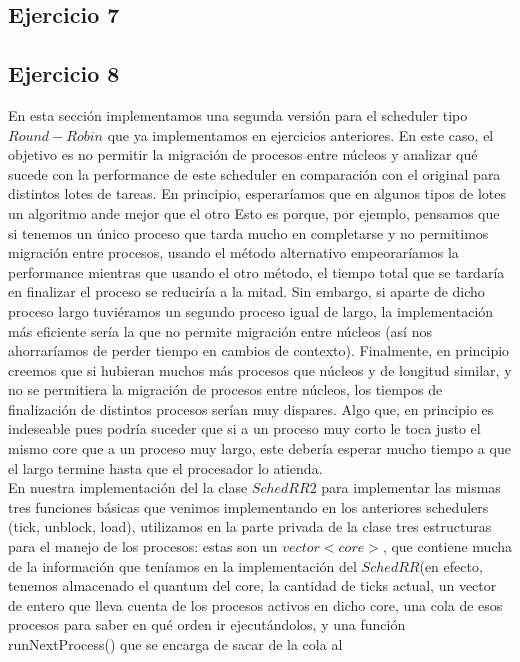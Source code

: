\documentclass[a4paper]{article}
\begin{document}
\newpage
\subsection{Ejercicio 7}
\newpage
\subsection{Ejercicio 8}
En esta secci\'on implementamos una segunda versi\'on para el scheduler tipo $Round-Robin$ que ya implementamos
en ejercicios anteriores. En este caso, el objetivo es no permitir la migraci\'on de procesos entre n\'ucleos y
analizar qu\'e sucede con la performance de este scheduler en comparaci\'on con el original para distintos lotes
de tareas. En principio, esperar\'iamos que en algunos tipos de lotes un algoritmo ande mejor que el otro
Esto es porque, por ejemplo, pensamos que si tenemos un 
\'unico proceso que tarda mucho en completarse y no permitimos migraci\'on entre procesos, usando el m\'etodo 
alternativo empeorar\'iamos la performance mientras que usando el otro m\'etodo, el tiempo total que se tardar\'ia
en finalizar el proceso se reducir\'ia a la mitad. Sin embargo, si aparte de dicho proceso largo tuvi\'eramos un
segundo proceso igual de largo, la implementaci\'on m\'as eficiente ser\'ia la que no permite migraci\'on entre 
n\'ucleos (as\'i nos ahorrar\'iamos de perder tiempo en cambios de contexto). Finalmente, en principio creemos que
si hubieran muchos m\'as procesos que n\'ucleos y de longitud similar, 
y no se permitiera la migraci\'on de procesos entre n\'ucleos, los tiempos de finalizaci\'on de distintos 
procesos ser\'ian muy dispares. Algo que, en principio es indeseable pues podr\'ia suceder que si a un proceso muy 
corto le toca justo el mismo core que a un proceso muy largo, este deber\'ia esperar mucho tiempo a que el largo
termine hasta que el procesador lo atienda. \\
En nuestra implementaci\'on del la clase $SchedRR2$ para implementar las mismas tres funciones b\'asicas que venimos
implementando en los anteriores schedulers (tick, unblock, load), utilizamos en la parte privada de la clase tres
estructuras para el manejo de los procesos: estas son un $vector<core>$, que contiene mucha de la informaci\'on 
que ten\'iamos en la implementaci\'on del $SchedRR$(en efecto, tenemos almacenado el quantum del core, la cantidad de
ticks actual, un vector de entero que lleva cuenta de los procesos activos en dicho core, una cola de esos procesos para
saber en qu\'e orden ir ejecut\'andolos, y una funci\'on runNextProcess() que se encarga de sacar de la cola al
\end{document}
